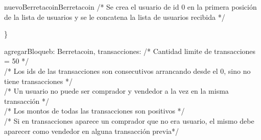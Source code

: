\documentclass[10pt,a4paper]{article}
\begin{document}
\begin{tcolorbox}
        \begin{proc}{nuevoBerretacoin}{}{Berretacoin}
            \textcolor{babyblue}{/* Se crea el usuario de id 0 en la primera posición de la lista de usuarios y se le concatena la lista de usuarios recibida */} \\
        \end{proc} \}
        \vspace{0.3em}
        \begin{proc}{agregarBloque}{\Inout b: Berretacoin, \In transacciones: }{}
            \textcolor{babyblue}{/* Cantidad limite de transacciones = 50 */} \\
            \textcolor{babyblue}{/* Los ids de las transacciones son consecutivos arrancando desde el 0, sino no tiene transacciones */} \\
            \textcolor{babyblue}{/* Un usuario no puede ser comprador y vendedor a la vez en la misma transacción */} \\
            \textcolor{babyblue}{/* Los montos de todas las transacciones son positivos */} \\
            \textcolor{babyblue}{/* Si en transacciones aparece un comprador que no era usuario, el mismo debe aparecer como vendedor en alguna transacción previa*/} \\
\end{proc}
\end{tcolorbox}
\end{document}
